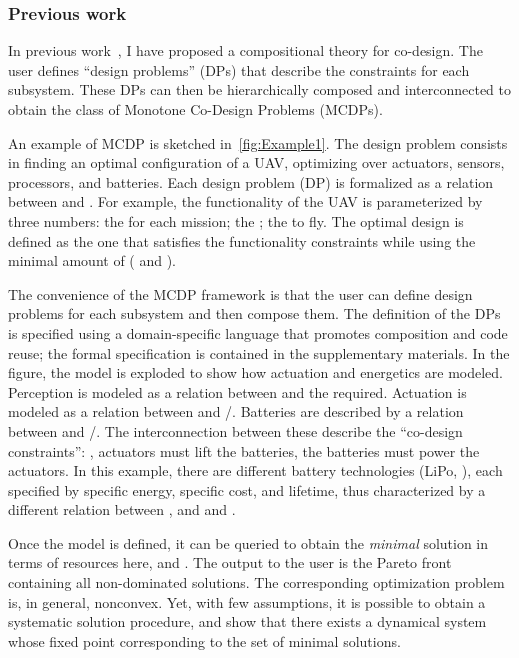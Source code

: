 \subsubsection*{Previous work}

In previous work~\cite{censi15monotone,censi15same,censi16codesign_sep16},
I have proposed a compositional theory for co-design. The user defines
``design problems'' (DPs) that describe the constraints for each
subsystem. These DPs can then be hierarchically composed and interconnected
to obtain the class of Monotone Co-Design Problems (MCDPs).

An example of MCDP is sketched in~\cref{fig:Example1}. The
design problem consists in finding an optimal configuration of a UAV,
optimizing over actuators, sensors, processors, and batteries. Each
design problem (DP) is formalized as a relation between 
and . For example, the functionality of the UAV is parameterized
by three numbers: the  for each mission; the
; the  to fly. The
optimal design is defined as the one that satisfies the functionality
constraints while using the minimal amount of  (
and ).

The convenience of the MCDP framework is that the user can define
design problems for each subsystem and then compose them. The definition
of the DPs is specified using a domain-specific language that promotes
composition and code reuse; the formal specification is contained
in the supplementary materials. In the figure, the model is exploded
to show how actuation and energetics are modeled. Perception is modeled
as a relation between  and the 
required. Actuation is modeled as a relation between  and
/. Batteries are described by a relation between
 and /. The interconnection between
these describe the ``co-design constraints'': \eg , actuators must
lift the batteries, the batteries must power the actuators. In this
example, there are different battery technologies (LiPo, \etc), each
specified by specific energy, specific cost, and lifetime, thus characterized
by a different relation between , 
and  and .

Once the model is defined, it can be queried to obtain the \emph{minimal}
solution in terms of resources \textemdash{} here, 
and . The output to the user is the Pareto front containing
all non-dominated solutions. The corresponding optimization problem
is, in general, nonconvex. Yet, with few assumptions, it is possible
to obtain a systematic solution procedure, and show that there exists
a dynamical system whose fixed point corresponding to the set of minimal
solutions.


